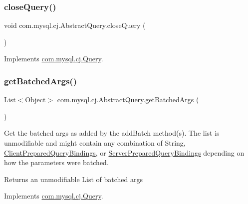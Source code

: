 \subsubsection{\texorpdfstring{close\+Query()}{closeQuery()}}
{\footnotesize\ttfamily void com.\+mysql.\+cj.\+Abstract\+Query.\+close\+Query (\begin{DoxyParamCaption}{ }\end{DoxyParamCaption})}



Implements \mbox{\hyperlink{interfacecom_1_1mysql_1_1cj_1_1_query_a5808add7bd2bffa44c7532995b16e442}{com.\+mysql.\+cj.\+Query}}.

\mbox{\label{classcom_1_1mysql_1_1cj_1_1_abstract_query_aef6b23f8de5efa38c0334c9245c346bf}} 
\subsubsection{\texorpdfstring{get\+Batched\+Args()}{getBatchedArgs()}}
{\footnotesize\ttfamily List$<$Object$>$ com.\+mysql.\+cj.\+Abstract\+Query.\+get\+Batched\+Args (\begin{DoxyParamCaption}{ }\end{DoxyParamCaption})}

Get the batched args as added by the add\+Batch method(s). The list is unmodifiable and might contain any combination of String, \mbox{\hyperlink{classcom_1_1mysql_1_1cj_1_1_client_prepared_query_bindings}{Client\+Prepared\+Query\+Bindings}}, or \mbox{\hyperlink{classcom_1_1mysql_1_1cj_1_1_server_prepared_query_bindings}{Server\+Prepared\+Query\+Bindings}} depending on how the parameters were batched.

\begin{DoxyReturn}{Returns}
an unmodifiable List of batched args 
\end{DoxyReturn}


Implements \mbox{\hyperlink{interfacecom_1_1mysql_1_1cj_1_1_query_af927782ce04741b0b0d3447e9b4f2a08}{com.\+mysql.\+cj.\+Query}}.

\mbox{\label{classcom_1_1mysql_1_1cj_1_1_abstract_query_a1159763749875aa297941f344d9cc542}} 
